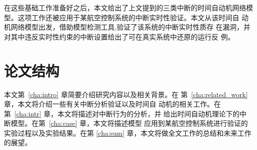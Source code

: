 在这些基础工作准备好之后，本文给出了上文提到的三类中断的时间自动机网络模
型。这项工作还被应用于某航空控制系统的中断实时性验证。本文从该时间自
动机网络模型出发，借助模型检测工具\uppaal ,验证了该系统的中断实时性质存
在漏洞，并对其中违反实时性约束的中断设置给出了可在真实系统中还原的运行反
例。

\section{论文结构}
\label{sec:structure}
本文第~\ref{cha:intro} 章简要介绍研究内容以及相关背景。在
第~\ref{cha:related_work} 章，本文将介绍一些有关中断分析验证以及时间自
动机的相关工作。在第~\ref{cha:intr} 章，本文将描述对中断行为的分析，并
给出时间自动机理论下的中断模型。在第~\ref{cha:case} 章，本文将描述模型
应用到某航空控制系统进行验证的实验过程以及实验结果。在第
\ref{cha:sum} 章，本文将做全文工作的总结和未来工作的展望。


